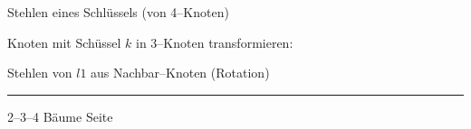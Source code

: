 \begin{slide}{}
\normalsize

\begin{center}
Stehlen eines Schl\"ussels (von 4--Knoten)
\end{center}
\vspace*{0.5cm}

\footnotesize

Knoten mit Sch\"ussel $k$  in 3--Knoten transformieren:

\hspace*{1.3cm} 

Stehlen von $l1$ aus Nachbar--Knoten (Rotation)

\hspace*{1.3cm} 



\vspace*{\fill}
\tiny \addtocounter{mypage}{1}
\rule{17cm}{1mm}
2--3--4 B\"aume  \hspace*{\fill} Seite 
\end{slide}


